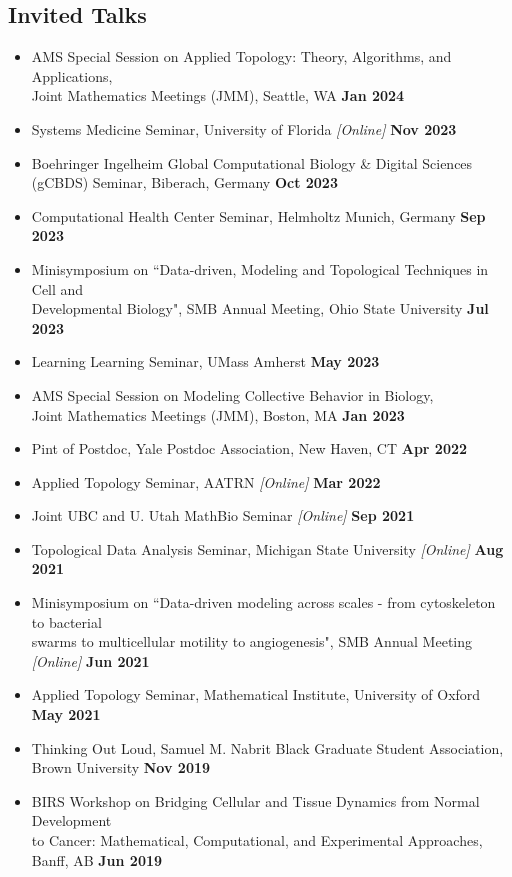 \documentclass[margin,line]{res}
\begin{document}
\begin{resume}
\section{\sc Invited Talks}
{\renewcommand\leftmargini{0em}
\begin{itemize}
\setlength\itemsep{0.3em}
\item[] AMS Special Session on Applied Topology: Theory, Algorithms, and Applications,\\Joint Mathematics Meetings (JMM), Seattle, WA \hfill {\bf Jan 2024} 
\item[] Systems Medicine Seminar, University of Florida \textit{[Online]} \hfill {\bf Nov 2023}
\item[] Boehringer Ingelheim Global Computational Biology \& Digital Sciences \\(gCBDS) Seminar, Biberach, Germany \hfill {\bf Oct 2023}
\item[] Computational Health Center Seminar, Helmholtz Munich, Germany \hfill {\bf Sep 2023}
\item[] Minisymposium on ``Data-driven, Modeling and Topological Techniques in Cell and \\Developmental Biology", SMB Annual Meeting, Ohio State University \hfill {\bf Jul 2023}
\item[] Learning Learning Seminar, UMass Amherst \hfill {\bf May 2023}
\item[] AMS Special Session on Modeling Collective Behavior in Biology,\\Joint Mathematics Meetings (JMM), Boston, MA \hfill {\bf Jan 2023}
\item[] Pint of Postdoc, Yale Postdoc Association, New Haven, CT \hfill {\bf Apr 2022}
\item[] Applied Topology Seminar, AATRN \textit{[Online]} \hfill {\bf Mar 2022}
\item[] Joint UBC and U. Utah MathBio Seminar \textit{[Online]} \hfill {\bf Sep 2021}
\item[] Topological Data Analysis Seminar, Michigan State University \textit{[Online]} \hfill {\bf Aug 2021}
\item[] Minisymposium on ``Data-driven modeling across scales - from cytoskeleton to bacterial \\swarms to multicellular motility to angiogenesis", SMB Annual Meeting \textit{[Online]} \hfill {\bf Jun 2021}
\item[] Applied Topology Seminar, Mathematical Institute, University of Oxford \hfill {\bf May 2021}
\item[] Thinking Out Loud, Samuel M. Nabrit Black Graduate Student Association, \\ Brown University \hfill {\bf Nov 2019}
\item[] BIRS Workshop on Bridging Cellular and Tissue Dynamics from Normal Development \\ to Cancer: Mathematical, Computational, and Experimental Approaches, Banff, AB \hfill {\bf Jun 2019} 
\end{itemize}
}


\end{resume}
\end{document}
